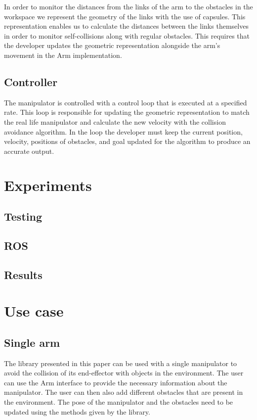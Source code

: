 \documentclass[a4paper, 10pt, conference]{ieeeconf}      %
\begin{document}
In order to monitor the distances from the links of the arm to the obstacles in the workspace we represent the geometry of the links with the use of capsules. This representation enables us to calculate the distances between the links themselves in order to monitor self-collisions along with regular obstacles. This requires that the developer updates the geometric representation alongside the arm’s movement in the Arm implementation. 


\subsection{Controller} %

The manipulator is controlled with a control loop that is executed at a specified rate. This loop is responsible for updating the geometric representation to match the real life manipulator and calculate the new velocity with the collision avoidance algorithm. In the loop the developer must keep the current position, velocity, positions of obstacles, and goal updated for the algorithm to produce an accurate output. 
 

\section{Experiments}

\subsection{Testing} %
\subsection{ROS} %
% 
\subsection{Results} %
\section{Use case}

\subsection{Single arm} %
The library presented in this paper can be used with a single manipulator to avoid the collision of its end-effector with objects in the environment.
The user can use the Arm interface to provide the necessary information about the manipulator.
The user can then also add different obstacles that are present in the environment.
The pose of the manipulator and the obstacles need to be updated using the methods given by the library.
\end{document}

